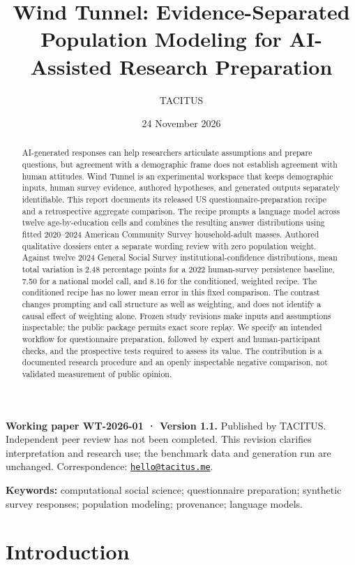 \documentclass[
  11pt,
]{article}
\title{Wind Tunnel: Evidence-Separated Population Modeling for
AI-Assisted Research Preparation}
\author{TACITUS}
\date{24 November 2026}
\let\originalsection\section
\renewcommand{\section}{\Needspace{5\baselineskip}\originalsection}
\begin{document}
\maketitle
\begin{abstract}
AI-generated responses can help researchers articulate assumptions and
prepare questions, but agreement with a demographic frame does not
establish agreement with human attitudes. Wind Tunnel is an experimental
workspace that keeps demographic inputs, human survey evidence, authored
hypotheses, and generated outputs separately identifiable. This report
documents its released US questionnaire-preparation recipe and a
retrospective aggregate comparison. The recipe prompts a language model
across twelve age-by-education cells and combines the resulting answer
distributions using fitted 2020--2024 American Community Survey
household-adult masses. Authored qualitative dossiers enter a separate
wording review with zero population weight. Against twelve 2024 General
Social Survey institutional-confidence distributions, mean total
variation is 2.48 percentage points for a 2022 human-survey persistence
baseline, 7.50 for a national model call, and 8.16 for the conditioned,
weighted recipe. The conditioned recipe has no lower mean error in this
fixed comparison. The contrast changes prompting and call structure as
well as weighting, and does not identify a causal effect of weighting
alone. Frozen study revisions make inputs and assumptions inspectable;
the public package permits exact score replay. We specify an intended
workflow for questionnaire preparation, followed by expert and
human-participant checks, and the prospective tests required to assess
its value. The contribution is a documented research procedure and an
openly inspectable negative comparison, not validated measurement of
public opinion.
\end{abstract}

\textbf{Working paper WT-2026-01 · Version 1.1.} Published by TACITUS.
Independent peer review has not been completed. This revision clarifies
interpretation and research use; the benchmark data and generation run
are unchanged. Correspondence:
\href{mailto:hello@tacitus.me}{\nolinkurl{hello@tacitus.me}}.

\textbf{Keywords:} computational social science; questionnaire
preparation; synthetic survey responses; population modeling;
provenance; language models.

\section{Introduction}\label{introduction}
\end{document}
